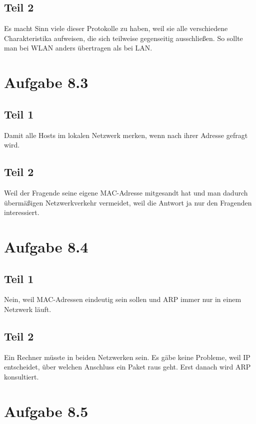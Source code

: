 \documentclass[10pt,a4paper]{article}
\begin{document}
\subsection{Teil 2}

Es macht Sinn viele dieser Protokolle zu haben, weil sie alle verschiedene
Charakteristika aufweisen, die sich teilweise gegenseitig ausschließen. So
sollte man bei WLAN anders übertragen als bei LAN.

\section{Aufgabe 8.3}

\subsection{Teil 1}

Damit alle Hosts im lokalen Netzwerk merken, wenn nach ihrer Adresse gefragt
wird.

\subsection{Teil 2}

Weil der Fragende seine eigene MAC-Adresse mitgesandt hat und man dadurch
übermäßigen Netzwerkverkehr vermeidet, weil die Antwort ja nur den Fragenden
interessiert.

\section{Aufgabe 8.4}

\subsection{Teil 1}

Nein, weil MAC-Adressen eindeutig sein sollen und ARP immer nur in einem
Netzwerk läuft.

\subsection{Teil 2}

Ein Rechner müsste in beiden Netzwerken sein. Es gäbe keine Probleme, weil IP
entscheidet, über welchen Anschluss ein Paket raus geht. Erst danach wird ARP
konsultiert.

\section{Aufgabe 8.5}
\end{document}

